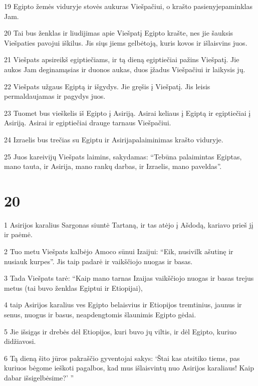 \par 19 Egipto žemės viduryje stovės aukuras Viešpačiui, o krašto pasienyje­paminklas Jam. 
\par 20 Tai bus ženklas ir liudijimas apie Viešpatį Egipto krašte, nes jie šauksis Viešpaties pavojui iškilus. Jis siųs jiems gelbėtoją, kuris kovos ir išlaisvins juos. 
\par 21 Viešpats apsireikš egiptiečiams, ir tą dieną egiptiečiai pažins Viešpatį. Jie aukos Jam deginamąsias ir duonos aukas, duos įžadus Viešpačiui ir laikysis jų. 
\par 22 Viešpats užgaus Egiptą ir išgydys. Jie gręšis į Viešpatį. Jis leisis permaldaujamas ir pagydys juos. 
\par 23 Tuomet bus vieškelis iš Egipto į Asiriją. Asirai keliaus į Egiptą ir egiptiečiai į Asiriją. Asirai ir egiptiečiai drauge tarnaus Viešpačiui. 
\par 24 Izraelis bus trečias su Egiptu ir Asirija­palaiminimas krašto viduryje. 
\par 25 Juos kareivijų Viešpats laimins, sakydamas: “Tebūna palaimintas Egiptas, mano tauta, ir Asirija, mano rankų darbas, ir Izraelis, mano paveldas”.



\chapter{20}


\par 1 Asirijos karalius Sargonas siuntė Tartaną, ir tas atėjo į Ašdodą, kariavo prieš jį ir paėmė. 
\par 2 Tuo metu Viešpats kalbėjo Amoco sūnui Izaijui: “Eik, nusivilk ašutinę ir nusiauk kurpes”. Jis taip padarė ir vaikščiojo nuogas ir basas. 
\par 3 Tada Viešpats tarė: “Kaip mano tarnas Izaijas vaikščiojo nuogas ir basas trejus metus (tai buvo ženklas Egiptui ir Etiopijai), 
\par 4 taip Asirijos karalius ves Egipto belaisvius ir Etiopijos tremtinius, jaunus ir senus, nuogus ir basus, neapdengtomis šlaunimis Egipto gėdai. 
\par 5 Jie išsigąs ir drebės dėl Etiopijos, kuri buvo jų viltis, ir dėl Egipto, kuriuo didžiavosi. 
\par 6 Tą dieną šito jūros pakraščio gyventojai sakys: ‘Štai kas atsitiko tiems, pas kuriuos bėgome ieškoti pagalbos, kad mus išlaisvintų nuo Asirijos karaliaus! Kaip dabar išsigelbėsime?’ ”



